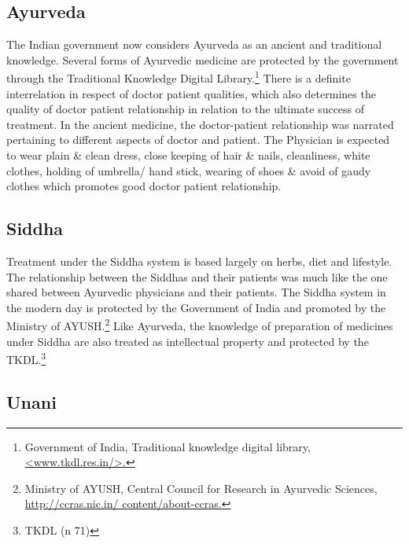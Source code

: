 \begin{multicols}{2}
\vspace{-.3cm}

\subsection*{Ayurveda}

\vspace{-.2cm}

\noi
The Indian government now considers Ayurveda as an ancient and traditional
knowledge. Several forms of Ayurvedic medicine are protected by the government
through the Traditional Knowledge Digital Library.\footnote{Government of India, Traditional knowledge digital library,  \url{<www.tkdl.res.in/>.}} There is a definite interrelation in respect of doctor patient qualities, which also determines the quality of doctor patient relationship in relation to the ultimate success of treatment. In the ancient medicine, the doctor-patient relationship was narrated pertaining to different aspects of doctor and patient. The Physician is expected to wear plain \& clean dress, close keeping of hair \& nails, cleanliness, white clothes, holding of umbrella/ hand stick, wearing of shoes \& avoid of gaudy clothes which promotes good doctor patient relationship.

\vspace{-.3cm}

\subsection*{Siddha}

\vspace{-.2cm}

\noi
Treatment under the Siddha system is based largely on herbs, diet and lifestyle. The relationship between the Siddhas and their patients was much like the one shared between Ayurvedic physicians and their patients. The Siddha system in the modern day is protected by the Government of India and promoted by the Ministry of AYUSH.\footnote{Ministry of AYUSH, Central Council for Research in Ayurvedic Sciences, \url{http://ccras.nic.in/ content/about-ccras.}} Like Ayurveda, the knowledge of preparation of medicines under Siddha are also treated as intellectual property and protected by the TKDL.\footnote{TKDL (n 71)}

\vspace{-.3cm}

\subsection*{Unani}


\end{multicols}
